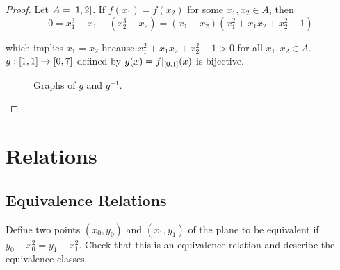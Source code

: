 \begin{proof}
    Let $A = \left[{1, 2}\right]$. If $f(x_{1}) = f(x_{2})$ for some $x_{1}, x_{2}\in A$, then
    \[
        0 = x_{1}^{3} - x_{1} - (x_{2}^{3} - x_{2}) = (x_{1} - x_{2})(x_{1}^{2} + x_{1}x_{2} + x_{2}^{2} - 1)
    \]

    which implies $x_{1} = x_{2}$ because $x_{1}^{2} + x_{1}x_{2} + x_{2}^{2} - 1 > 0$ for all $x_{1}, x_{2}\in A$. $g: \left[{1, 1}\right]\to \left[{0, 7}\right]$ defined by $g(x) = f\vert_{\left[{0,1}\right]}(x)$ is bijective.
    \begin{figure}[htp]
        \centering
        \caption*{Graphs of $g$ and $g^{-1}$.}
    \end{figure}
\end{proof}

\section{Relations}

\subsection*{Equivalence Relations}

\begin{exercise}\label{chapter1:section3:exercise1}
    Define two points $(x_{0}, y_{0})$ and $(x_{1}, y_{1})$ of the plane to be equivalent if $y_{0} - x_{0}^{2} = y_{1} - x_{1}^{2}$. Check that this is an equivalence relation and describe the equivalence classes.
\end{exercise}

